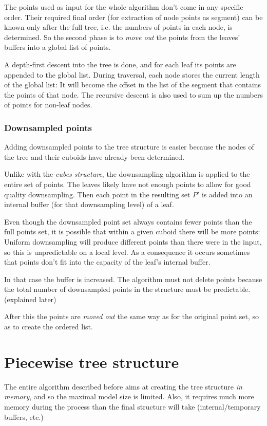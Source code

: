 \documentclass[a4paper,10pt,abstracton,notitlepage]{scrreprt}
\begin{document}
The points used as input for the whole algorithm don't come in any specific order. Their required final order (for extraction of node points as segment) can be known only after the full tree, i.e. the numbers of points in each node, is determined. So the second phase is to \emph{move out} the points from the leaves' buffers into a global list of points.

A depth-first descent into the tree is done, and for each leaf its points are appended to the global list. During traversal, each node stores the current length of the global list: It will become the offset in the list of the segment that contains the points of that node. The recursive descent is also used to sum up the numbers of points for non-leaf nodes.

\subsubsection{Downsampled points}
Adding downsampled points to the tree structure is easier because the nodes of the tree and their cuboids have already been determined.

Unlike with the \emph{cubes structure}, the downsampling algorithm is applied to the entire set of points. The leaves likely have not enough points to allow for good quality downsampling. Then each point in the resulting set $P'$ is added into an internal buffer (for that downsampling level) of a leaf.

Even though the downsampled point set always contains fewer points than the full points set, it is possible that within a given cuboid there will be more points: Uniform downsampling will produce different points than there were in the input, so this is unpredictable on a local level. As a consequence it occurs sometimes that points don't fit into the capacity of the leaf's internal buffer.

In that case the buffer is increased. The algorithm must not delete points because the total number of downsampled points in the structure must be predictable. (explained later)

After this the points are \emph{moved out} the same way as for the original point set, so as to create the ordered list.


\section{Piecewise tree structure}
The entire algorithm described before aims at creating the tree structure \emph{in memory}, and so the maximal model size is limited. Also, it requires much more memory during the process than the final structure will take (internal/temporary buffers, etc.)
\end{document}
